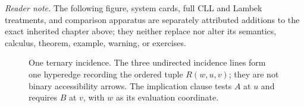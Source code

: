 \noindent\textit{Reader note.} The following figure, system cards, full CLL and
Lambek treatments, and comparison apparatus are separately attributed
additions to the exact inherited chapter above; they neither replace nor alter
its semantics, calculus, theorem, example, warning, or exercises.

\begin{figure}[!htbp]
\centering
{}
\caption{One ternary incidence.  The three undirected
incidence lines form one hyperedge recording the ordered tuple \(R(w,u,v)\);
they are not binary accessibility arrows.  The implication clause tests
\(A\) at \(u\) and requires \(B\) at \(v\), with \(w\) as its evaluation
coordinate.}
\label{fig:p08-rm-ternary}
\end{figure}

